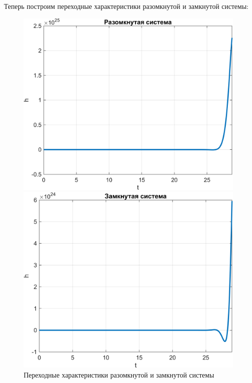 Теперь построим переходные характеристики разомкнутой и замкнутой системы:
\begin{figure}[H]
    \centering
    \begin{minipage}{0.45\textwidth}
        \centering
        \includegraphics[width=1\textwidth, trim={0cm 0cm 0cm 0cm}]{../images/1_1_h_ol.png}
    \end{minipage}
    \hfill
    \begin{minipage}{0.45\textwidth}
        \centering
        \includegraphics[width=1\textwidth, trim={0cm 0cm 0cm 0cm}]{../images/1_1_h_cl.png}
    \end{minipage}
    \caption{Переходные характеристики разомкнутой и замкнутой системы}
\end{figure}

